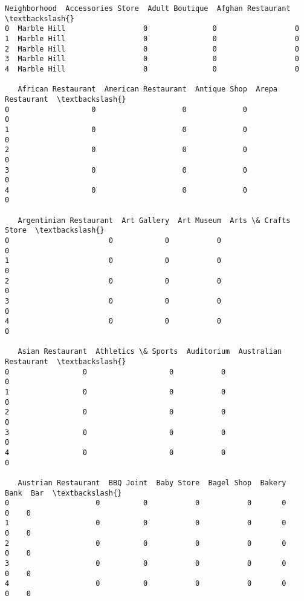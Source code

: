\documentclass[11pt]{article}
\makeatletter
\newcommand{\boxspacing}{\kern\kvtcb@left@rule\kern\kvtcb@boxsep}
\newcommand{\prompt}[4]{
        \ttfamily\llap{{\color{#2}[#3]:\hspace{3pt}#4}}\vspace{-\baselineskip}
    }
\makeatother
\begin{document}
            \begin{tcolorbox}[breakable, size=fbox, boxrule=.5pt, pad at break*=1mm, opacityfill=0]
\prompt{Out}{outcolor}{57}{\boxspacing}
\begin{Verbatim}[commandchars=\\\{\}]
  Neighborhood  Accessories Store  Adult Boutique  Afghan Restaurant  \textbackslash{}
0  Marble Hill                  0               0                  0
1  Marble Hill                  0               0                  0
2  Marble Hill                  0               0                  0
3  Marble Hill                  0               0                  0
4  Marble Hill                  0               0                  0

   African Restaurant  American Restaurant  Antique Shop  Arepa Restaurant  \textbackslash{}
0                   0                    0             0                 0
1                   0                    0             0                 0
2                   0                    0             0                 0
3                   0                    0             0                 0
4                   0                    0             0                 0

   Argentinian Restaurant  Art Gallery  Art Museum  Arts \& Crafts Store  \textbackslash{}
0                       0            0           0                    0
1                       0            0           0                    0
2                       0            0           0                    0
3                       0            0           0                    0
4                       0            0           0                    0

   Asian Restaurant  Athletics \& Sports  Auditorium  Australian Restaurant  \textbackslash{}
0                 0                   0           0                      0
1                 0                   0           0                      0
2                 0                   0           0                      0
3                 0                   0           0                      0
4                 0                   0           0                      0

   Austrian Restaurant  BBQ Joint  Baby Store  Bagel Shop  Bakery  Bank  Bar  \textbackslash{}
0                    0          0           0           0       0     0    0
1                    0          0           0           0       0     0    0
2                    0          0           0           0       0     0    0
3                    0          0           0           0       0     0    0
4                    0          0           0           0       0     0    0


\end{Verbatim}
\end{tcolorbox}
\end{document}
